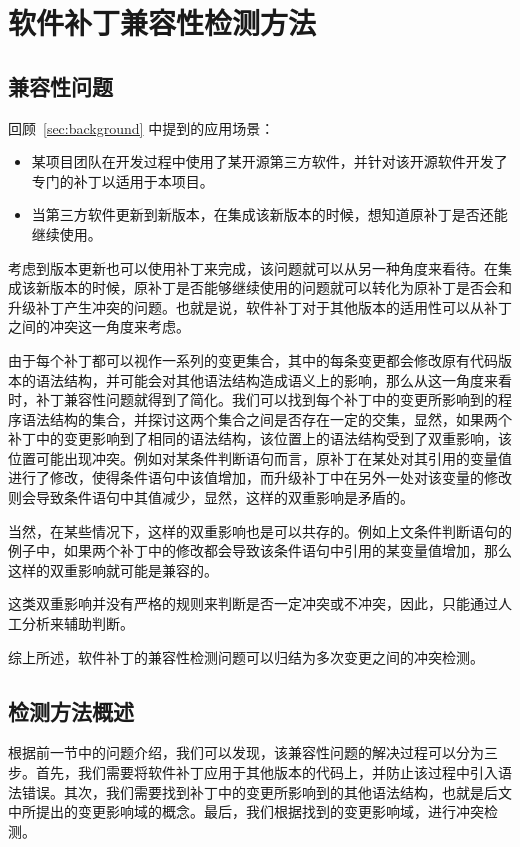 \chapter{软件补丁兼容性检测方法}

\section{兼容性问题}
\label {sec_problem}

回顾~\ref{sec:background} 中提到的应用场景：
\begin{itemize}
	\item 某项目团队在开发过程中使用了某开源第三方软件，并针对该开源软件开发了专门的补丁以适用于本项目。
	\item 当第三方软件更新到新版本，在集成该新版本的时候，想知道原补丁是否还能继续使用。
\end{itemize}

考虑到版本更新也可以使用补丁来完成，该问题就可以从另一种角度来看待。在集成该新版本的时候，原补丁是否能够继续使用的问题就可以转化为原补丁是否会和升级补丁产生冲突的问题。也就是说，软件补丁对于其他版本的适用性可以从补丁之间的冲突这一角度来考虑。

由于每个补丁都可以视作一系列的变更集合，其中的每条变更都会修改原有代码版本的语法结构，并可能会对其他语法结构造成语义上的影响，那么从这一角度来看时，补丁兼容性问题就得到了简化。我们可以找到每个补丁中的变更所影响到的程序语法结构的集合，并探讨这两个集合之间是否存在一定的交集，显然，如果两个补丁中的变更影响到了相同的语法结构，该位置上的语法结构受到了双重影响，该位置可能出现冲突。例如对某条件判断语句而言，原补丁在某处对其引用的变量值进行了修改，使得条件语句中该值增加，而升级补丁中在另外一处对该变量的修改则会导致条件语句中其值减少，显然，这样的双重影响是矛盾的。

当然，在某些情况下，这样的双重影响也是可以共存的。例如上文条件判断语句的例子中，如果两个补丁中的修改都会导致该条件语句中引用的某变量值增加，那么这样的双重影响就可能是兼容的。

这类双重影响并没有严格的规则来判断是否一定冲突或不冲突，因此，只能通过人工分析来辅助判断。

综上所述，软件补丁的兼容性检测问题可以归结为多次变更之间的冲突检测。

\section{检测方法概述}
\label {sec_method}

根据前一节中的问题介绍，我们可以发现，该兼容性问题的解决过程可以分为三步。首先，我们需要将软件补丁应用于其他版本的代码上，并防止该过程中引入语法错误。其次，我们需要找到补丁中的变更所影响到的其他语法结构，也就是后文中所提出的变更影响域的概念。最后，我们根据找到的变更影响域，进行冲突检测。

